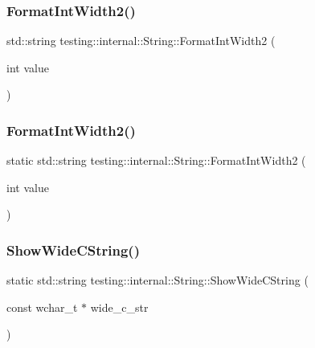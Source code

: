 \subsubsection{\texorpdfstring{FormatIntWidth2()}{FormatIntWidth2()}\hspace{0.1cm}{\footnotesize\ttfamily [2/3]}}
{\footnotesize\ttfamily std\+::string testing\+::internal\+::\+String\+::\+Format\+Int\+Width2 (\begin{DoxyParamCaption}\item[{int}]{value }\end{DoxyParamCaption})\hspace{0.3cm}{\ttfamily [static]}}

\mbox{\label{classtesting_1_1internal_1_1_string_a51cab855f7ec6091e5886b6be5598ca2}} 
\subsubsection{\texorpdfstring{FormatIntWidth2()}{FormatIntWidth2()}\hspace{0.1cm}{\footnotesize\ttfamily [3/3]}}
{\footnotesize\ttfamily static std\+::string testing\+::internal\+::\+String\+::\+Format\+Int\+Width2 (\begin{DoxyParamCaption}\item[{int}]{value }\end{DoxyParamCaption})\hspace{0.3cm}{\ttfamily [static]}}

\mbox{\label{classtesting_1_1internal_1_1_string_acbf0511e9ae5009f42de77e565f6ba61}} 
\subsubsection{\texorpdfstring{ShowWideCString()}{ShowWideCString()}\hspace{0.1cm}{\footnotesize\ttfamily [1/3]}}
{\footnotesize\ttfamily static std\+::string testing\+::internal\+::\+String\+::\+Show\+Wide\+C\+String (\begin{DoxyParamCaption}\item[{const wchar\+\_\+t $\ast$}]{wide\+\_\+c\+\_\+str }\end{DoxyParamCaption})\hspace{0.3cm}{\ttfamily [static]}}

